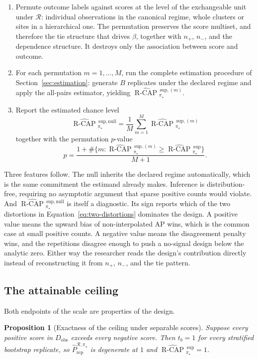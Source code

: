 \documentclass[11pt]{article}
\newcommand{\Regime}{\mathcal{R}}
\newcommand{\RCAPHat}{\widehat{\operatorname{R\text{-}CAP}}{}^{\,\mathrm{sup}}_{\pi_\star}}
\newcommand{\RCAPnullHat}{\widehat{\operatorname{R\text{-}CAP}}{}^{\,\mathrm{sup,null}}_{\pi_\star}}
\newcommand{\PRepHat}{\widehat{P}_{\mathrm{rep}}^{\Regime,\pi_\star}}
\newtheorem{proposition}{Proposition}
\theoremstyle{remark}
\begin{document}
\begin{enumerate}
\item Permute outcome labels against scores at the level of the exchangeable unit under $\Regime$: individual observations in the canonical regime, whole clusters or sites in a hierarchical one. The permutation preserves the score multiset, and therefore the tie structure that drives $\beta$, together with $n_+$, $n_-$, and the dependence structure. It destroys only the association between score and outcome.
\item For each permutation $m=1,\ldots,M$, run the complete estimation procedure of Section~\ref{sec:estimation}: generate $B$ replicates under the declared regime and apply the all-pairs estimator, yielding $\widehat{\operatorname{R\text{-}CAP}}{}^{\,\mathrm{sup},(m)}_{\pi_\star}$.
\item Report the estimated chance level
\[
\RCAPnullHat=\frac{1}{M}\sum_{m=1}^{M}\widehat{\operatorname{R\text{-}CAP}}{}^{\,\mathrm{sup},(m)}_{\pi_\star}
\]
together with the permutation $p$-value
\[
p=\frac{1+\#\{m:\widehat{\operatorname{R\text{-}CAP}}{}^{\,\mathrm{sup},(m)}_{\pi_\star}\geq\RCAPHat\}}{M+1}.
\]
\end{enumerate}

Three features follow. The null inherits the declared regime automatically, which is the same commitment the estimand already makes. Inference is distribution-free, requiring no asymptotic argument that sparse positive counts would violate. And $\RCAPnullHat$ is itself a diagnostic. Its sign reports which of the two distortions in Equation~\eqref{eq:two-distortions} dominates the design. A positive value means the upward bias of non-interpolated AP wins, which is the common case at small positive counts. A negative value means the disagreement penalty wins, and the repetitions disagree enough to push a no-signal design below the analytic zero. Either way the researcher reads the design's contribution directly instead of reconstructing it from $n_+$, $n_-$, and the tie pattern.

\subsection{The attainable ceiling}
\label{sec:ceiling}

Both endpoints of the scale are properties of the design.

\begin{proposition}[Exactness of the ceiling under separable scores]
Suppose every positive score in $D_{\mathrm{obs}}$ exceeds every negative score. Then $t_b=1$ for every stratified bootstrap replicate, so $\PRepHat$ is degenerate at $1$ and $\RCAPHat=1$.
\end{proposition}
\end{document}
